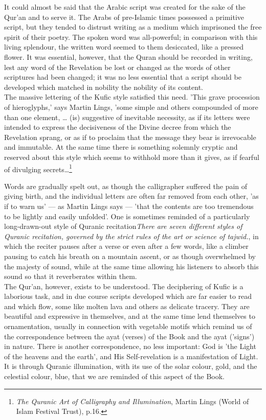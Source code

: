 \documentclass[11pt, b5paper, twoside]{book}
\begin{document}
It could almost be said that the Arabic script was created for the sake of the Qur'an and to serve 
it. The Arabs of pre-Islamic times possessed a primitive script, but they tended to distrust writing 
as a medium which imprisoned the free spirit of their poetry. The spoken word was all-powerful; in 
comparison with this living splendour, the written word seemed to them desiccated, like a pressed 
flower. It was essential, however, that the Quran should be recorded in writing, lest any word of the 
Revelation be lost or changed as the words of other scriptures had been changed; it was no less 
essential that a script should be developed which matched in nobility the nobility of its content. \\

The massive lettering of the Kufic style satisfied this need. 'This grave procession of hieroglyphs,' 
says Martin Lings, 'some simple and others compounded of more than one element, \ldots{} (is) suggestive 
of inevitable necessity, as if its letters were intended to express the decisiveness of the Divine 
decree from which the Revelation sprang, or as if to proclaim that the message they bear is 
irrevocable and immutable. At the same time there is something solemnly cryptic and reserved about 
this style which seems to withhold more than it gives, as if fearful of divulging secrets\ldots{}\footnote{\emph{The Quranic Art of Calligraphy and Illumination}, Martin Lings (World of Islam Festival Trust), p.16.}

Words are gradually spelt out, as though the calligrapher suffered the pain of giving birth, and the 
individual letters are often far removed from each other, 'as if to warn us' --- as Martin Lings says --- 
'that the contents are too tremendous to be lightly and easily unfolded'. One is sometimes reminded 
of a particularly long-drawn-out style of Quranic recitation\emph{There are seven different styles of Quranic recitation, governed by the strict rules of the art or 
science of tajwid.}, in which the reciter pauses after a 
verse or even after a few words, like a climber pausing to catch his breath on a mountain ascent, or 
as though overwhelmed by the majesty of sound, while at the same time allowing his listeners to 
absorb this sound so that it reverberates within them.\\ 

The Qur'an, however, exists to be understood. The deciphering of Kufic is a laborious task, and in 
due course scripts developed which are far easier to read and which flow, some like molten lava and 
others as delicate tracery. They are beautiful and expressive in themselves, and at the same time 
lend themselves to ornamentation, usually in connection with vegetable motifs which remind us of the 
correspondence between the ayat (verses) of the Book and the ayat ('signs') in nature. There is 
another correspondence, no less important: God is 'the Light of the heavens and the earth', and His 
Self-revelation is a manifestation of Light. It is through Quranic illumination, with its use of the 
solar colour, gold, and the celestial colour, blue, that we are reminded of this aspect of the Book. \\
\end{document}
